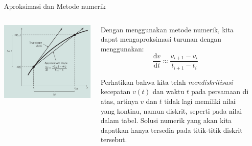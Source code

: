 \begin{frame}{Aproksimasi dan Metode numerik}

\begin{columns}[T]
\begin{column}{0.5\textwidth}
{\centering
\includegraphics[width=1\textwidth,height=\textheight]{../chapra_python/Chapra_Fig_1_3.png}
\par}
\end{column}

\begin{column}{0.5\textwidth}
Dengan menggunakan metode numerik, kita dapat mengaproksimasi turunan
dengan menggunakan:
\begin{equation*}
\frac{\mathrm{d}v}{\mathrm{d}t} \approx \frac{v_{i+1} - v_{i}}{t_{i+1} - t_{i}}
\end{equation*}

Perhatikan bahwa kita telah \emph{mendiskritisasi} kecepatan \(v(t)\)
dan waktu \(t\) pada persamaan di atas, artinya \(v\) dan \(t\) tidak
lagi memiliki nilai yang kontinu, namun diskrit, seperti pada nilai
dalam tabel. Solusi numerik yang akan kita dapatkan hanya tersedia pada
titik-titik diskrit tersebut.
\end{column}
\end{columns}
\end{frame}




